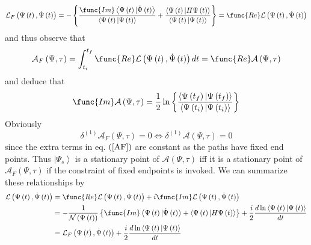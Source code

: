 \documentclass[aps,preprint]{revtex4}
\begin{document}
\begin{equation}
\mathcal{L}_{F}\left( \Psi\left( t\right) ,\dot{\Psi}\left( t\right) \right)
=-\left\{ \frac{\func{Im}\left\langle \Psi\left( t\right) |\dot{\Psi}\left(
t\right) \right\rangle }{\left\langle \Psi\left( t\right) |\Psi\left(
t\right) \right\rangle }+\frac{\left\langle \Psi\left( t\right) |H\Psi\left(
t\right) \right\rangle }{\left\langle \Psi\left( t\right) |\Psi\left(
t\right) \right\rangle }\right\} =\func{Re}\mathcal{L}\left( \Psi\left(
t\right) ,\dot{\Psi}\left( t\right) \right)
\end{equation}
and thus observe that 
\begin{equation}
\mathcal{A}_{F}\left( \Psi,\tau\right) =\int_{t_{i}}^{t_{f}}\func{Re}%
\mathcal{L}\left( \Psi\left( t\right) ,\dot{\Psi}\left( t\right) \right) dt=%
\func{Re}\mathcal{A}\left( \Psi,\tau\right)
\end{equation}
and deduce that 
\begin{equation}
\func{Im}\mathcal{A}\left( \Psi,\tau\right) =\frac{1}{2}\ln\left\{ \frac{%
\left\langle \Psi\left( t_{f}\right) |\Psi\left( t_{f}\right) \right\rangle 
}{\left\langle \Psi\left( t_{i}\right) |\Psi\left( t_{i}\right)
\right\rangle }\right\}
\end{equation}
Obviously 
\begin{equation}
\delta^{\left( 1\right) }\mathcal{A}_{F}\left( \Psi,\tau\right)
=0\Longleftrightarrow\delta^{\left( 1\right) }\mathcal{A}\left( \Psi
,\tau\right) =0
\end{equation}
since the extra terms in eq. $\left( \ref{AF}\right) $ are constant as the
paths have fixed end points. Thus $\left| \Psi_{s}\right\rangle $ is a
stationary point of $\mathcal{A}\left( \Psi,\tau\right) $ iff it is a
stationary point of $\mathcal{A}_{F}\left( \Psi,\tau\right) $ if the
constraint of fixed endpoints is invoked. We can summarize these
relationships by 
\begin{align}
\mathcal{L}\left( \Psi\left( t\right) ,\dot{\Psi}\left( t\right) \right) & =%
\func{Re}\mathcal{L}\left( \Psi\left( t\right) ,\dot{\Psi }\left( t\right)
\right) +i\func{Im}\mathcal{L}\left( \Psi\left( t\right) ,\dot{\Psi}\left(
t\right) \right)  \notag \\
& =-\frac{1}{\mathcal{N}\left( \Psi\left( t\right) \right) }\left\{ \func{Im}%
\left\langle \Psi\left( t\right) |\dot{\Psi}\left( t\right) \right\rangle
+\left\langle \Psi\left( t\right) |H\Psi\left( t\right) \right\rangle
\right\} +\frac{i}{2}\frac{d\ln\left\langle \Psi\left( t\right) |\Psi\left(
t\right) \right\rangle }{dt}  \notag \\
& =\mathcal{L}_{F}\left( \Psi\left( t\right) ,\dot{\Psi}\left( t\right)
\right) +\frac{i}{2}\frac{d\ln\left\langle \Psi\left( t\right) |\Psi\left(
t\right) \right\rangle }{dt}
\end{align}
\end{document}
